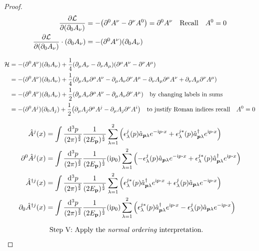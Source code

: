 \documentclass[letterpaper]{article}
\theoremstyle{definition}
\newcommand{\intp}{\int \frac{\dd[3]{p}}{(2\pi)^\frac{3}{2}}  \frac{1}{(2E_{\vb{p}})^{\frac{1}{2}}}}
\begin{document}
\begin{proof}
  \begin{align*}
    \pdv{\mathcal{L}}{(\partial_0 A_\nu)}                        & =-\pqty{\partial^0 A^\nu-\partial^\nu A^0}=\partial^0 A^\nu\qq{Recall}A^0=0 \\
    \pdv{\mathcal{L}}{(\partial_0 A_\nu)}\cdot(\partial_0 A_\nu) & =-(\partial^0 A^\nu)(\partial_0 A_\nu)                                      \\
  \end{align*}

  \begin{align*}
    \mathcal{H} & =-(\partial^0 A^\nu)(\partial_0 A_\nu)+\frac{1}{4}\pqty{\partial_\mu A_\nu-\partial_\nu A_\mu}\pqty{\partial^\mu A^\nu-\partial^\nu A^\mu}
    \\
                & =-(\partial^0 A^\nu)(\partial_0 A_\nu)+\frac{1}{4}\pqty{\partial_\mu A_\nu \partial^\mu A^\nu -\partial_\mu A_\nu \partial^\nu A^\mu-\partial_\nu A_\mu \partial^\mu A^\nu +\partial_\nu A_\mu \partial^\nu A^\mu} \\
                & =-(\partial^0 A^\nu)(\partial_0 A_\nu)+\frac{1}{2}\pqty{\partial_\mu A_\nu \partial^\mu A^\nu -\partial_\mu A_\nu \partial^\nu A^\mu}\qq{by changing labels in sums}                                               \\
                & =-(\partial^0 A^j)(\partial_0 A_j)+\frac{1}{2}\pqty{\partial_\mu A_j \partial^\mu A^j -\partial_\mu A_j \partial^\nu A^i}\qq{to justify Roman indices recall}A^0=0                                                 \\
  \end{align*}

  \begin{align*}
    \hat{A}^j(x)                     & =\intp\sum^2_{\lambda=1}\pqty{\epsilon^j_\lambda(p)\hat{a}_{\vb*{p}\lambda}e^{-\text{i}p\vdot x}+\epsilon^{j*}_\lambda(p)\hat{a}^\dagger_{\vb*{p}\lambda}e^{\text{i}p\vdot x}}                \\
    \partial^0\hat{A}^j(x)           & =\intp(\text{i}p_0)\sum^2_{\lambda=1}\pqty{-\epsilon^j_\lambda(p)\hat{a}_{\vb*{p}\lambda}e^{-\text{i}p\vdot x}+\epsilon^{j*}_\lambda(p)\hat{a}^\dagger_{\vb*{p}\lambda}e^{\text{i}p\vdot x}}  \\
    \hat{A}^{\dagger j}(x)           & =\intp\sum^2_{\lambda=1}\pqty{\epsilon^{j*}_\lambda(p)\hat{a}^\dagger_{\vb*{p}\lambda}e^{\text{i}p\vdot x}+\epsilon^{j}_\lambda(p)\hat{a}_{\vb*{p}\lambda}e^{-\text{i}p\vdot x}}              \\
    \partial_0\hat{A}^{\dagger j}(x) & =\intp(\text{i}p_0)\sum^2_{\lambda=1}\pqty{\epsilon^{j*}_\lambda(p)\hat{a}^\dagger_{\vb*{p}\lambda}e^{\text{i}p\vdot x}-\epsilon^{j}_\lambda(p)\hat{a}_{\vb*{p}\lambda}e^{-\text{i}p\vdot x}} \\
  \end{align*}

  \begin{align*}
    \qq*{Step V: Apply the \emph{normal ordering} interpretation.} \\
  \end{align*}
\end{proof}
\end{document}

